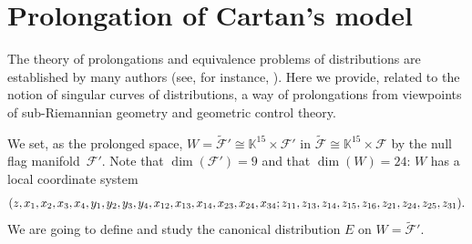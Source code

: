 \documentclass[pdftex]{sigma}
\numberwithin{equation}{section}
\theoremstyle{definition}
\newcommand{\KK}{\mathbb{K}}
\newcommand{\0}{\boldsymbol{0}}
\begin{document}
\section{Prolongation of Cartan's model}
\label{Prolongation-of-Cartan's-$(8, 15)$-distribution}

The theory of prolongations and equivalence problems of distributions are established by many authors (see, for instance,
\cite{BCGGG, Montgomery, Morimoto, Tanaka1}).
Here we provide, related to the notion of singular curves of distributions, a way of prolongations
from viewpoints of sub-Riemannian geometry and geometric control theory.

We set, as the prolonged space,
$W = \widetilde{\mathcal F}' \cong \KK^{15}\times {\mathcal F}'$
in $\widetilde{\mathcal F} \cong \KK^{15}\times {\mathcal F}$
by the null flag manifold~${\mathcal F}'$.
Note that $\dim({\mathcal F}') = 9$ and that $\dim(W) = 24$:
$W$ has a local coordinate system
\begin{gather*}
(z,\hspace{-0.2pt} x_1,\hspace{-0.2pt} x_2,\hspace{-0.2pt} x_3,\hspace{-0.2pt} x_4,\hspace{-0.2pt} y_1,\hspace{-0.2pt} y_2,\hspace{-0.2pt} y_3,\hspace{-0.2pt} y_4,\hspace{-0.2pt} x_{12},\hspace{-0.2pt} x_{13},\hspace{-0.2pt} x_{14},\hspace{-0.2pt} x_{23},\hspace{-0.2pt} x_{24},\hspace{-0.2pt} x_{34};\hspace{-0.2pt}
z_{11},\hspace{-0.2pt} z_{13},\hspace{-0.2pt} z_{14},\hspace{-0.2pt} z_{15},\hspace{-0.2pt} z_{16},\hspace{-0.2pt} z_{21},\hspace{-0.2pt}
 z_{24},\hspace{-0.2pt} z_{25},\hspace{-0.2pt} z_{31}).
\end{gather*}
We are going to define and study the canonical distribution $E$ on $W = \widetilde{\mathcal F}'$.
\end{document}
